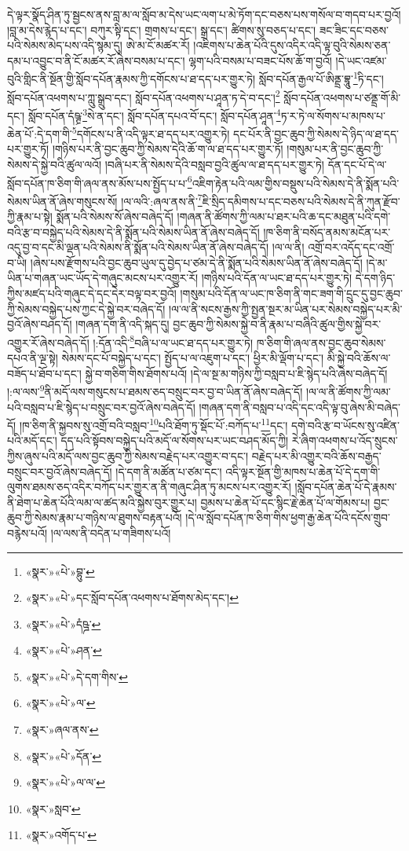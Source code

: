 དེ་ལྟར་སྣོད་ཤིན་ཏུ་སྦྱངས་ནས་བླ་མ་ལ་སློབ་མ་དེས་ཡང་ལག་པ་མེ་ཏོག་དང་བཅས་པས་གསོལ་བ་གདབ་པར་བྱའོ། །བླ་མ་དེས་རྙེད་པ་དང་། བཀུར་སྟི་དང་། གྲགས་པ་དང་། སྒྲ་དང་། ཚིགས་སུ་བཅད་པ་དང་། ཟང་ཟིང་དང་བཅས་པའི་སེམས་མེད་པས་འདི་སྙམ་དུ། ཨེ་མ་ངོ་མཚར་རོ། །འཇིགས་པ་ཆེན་པོའི་དུས་འདིར་འདི་ལྟ་བུའི་སེམས་ཅན་དམ་པ་འབྱུང་བ་ནི་ངོ་མཚར་རོ་ཞེས་བསམ་པ་དང་། ལྷག་པའི་བསམ་པ་བཟང་པོས་ཆོ་ག་བྱའོ། །དེ་ཡང་འཛམ་བུའི་གླིང་ནི་སྔོན་གྱི་སློབ་དཔོན་རྣམས་ཀྱི་དགོངས་པ་ཐ་དད་པར་གྱུར་ཏེ། སློབ་དཔོན་རྒྱལ་པོ་ཨིནྡྲ་བྷཱུ་\footnote{«སྣར་»«པེ་»བྷུ་}ཏི་དང་། སློབ་དཔོན་འཕགས་པ་ཀླུ་སྒྲུབ་དང་། སློབ་དཔོན་འཕགས་པ་ཤཱན་ཏ་དེ་བ་དང་།\footnote{«སྣར་»«པེ་»དང་སློབ་དཔོན་འཕགས་པ་ཐོགས་མེད་དང་།} སློབ་དཔོན་འཕགས་པ་ཙནྡྲ་གོ་མི་དང་། སློབ་དཔོན་དཾཥྚྲ་\footnote{«སྣར་»«པེ་»དཾཥྜ་}སེ་ན་དང་། སློབ་དཔོན་དཔའ་བོ་དང་། སློབ་དཔོན་ཤཱན་\footnote{«སྣར་»«པེ་»ཤན་}ཏ་ར་ཏེ་ལ་སོགས་པ་མཁས་པ་ཆེན་པོ་:དེ་དག་གི་\footnote{«སྣར་»«པེ་»དེ་དག་གིས་}དགོངས་པ་ནི་འདི་ལྟར་ཐ་དད་པར་འགྱུར་ཏེ། དང་པོར་ནི་བྱང་ཆུབ་ཀྱི་སེམས་དེ་ཉིད་ལ་ཐ་དད་པར་གྱུར་ཏོ། །གཉིས་པར་ནི་བྱང་ཆུབ་ཀྱི་སེམས་དེའི་ཆོ་ག་ལ་ཐ་དད་པར་གྱུར་ཏོ། །གསུམ་པར་ནི་བྱང་ཆུབ་ཀྱི་སེམས་དེ་སྐྱེ་བའི་ཚུལ་ལའོ། །བཞི་པར་ནི་སེམས་དེའི་བསླབ་བྱའི་ཚུལ་ལ་ཐ་དད་པར་གྱུར་ཏེ། དོན་དང་པོ་དེ་ལ་སློབ་དཔོན་ཁ་ཅིག་གི་ཞལ་ནས་མོས་པས་སྤྱོད་པ་པ་\footnote{«སྣར་»«པེ་»ལ་}འཇིག་རྟེན་པའི་ལམ་གྱིས་བསྡུས་པའི་སེམས་དེ་ནི་སྨོན་པའི་སེམས་ཡིན་ནོ་ཞེས་གསུངས་སོ། །ལ་ལའི་:ཞལ་ནས་ནི་\footnote{«སྣར་»ཞལ་ནས་}ཇི་སྲིད་དམིགས་པ་དང་བཅས་པའི་སེམས་དེ་ནི་ཀུན་རྫོབ་ཀྱི་རྣམ་པ་སྟེ། སྨོན་པའི་སེམས་སོ་ཞེས་བཞེད་དོ། །གཞན་ནི་ཚོགས་ཀྱི་ལམ་པ་ཐར་པའི་ཆ་དང་མཐུན་པའི་དགེ་བའི་རྩ་བ་བསྐྱེད་པའི་སེམས་དེ་ནི་སྨོན་པའི་སེམས་ཡིན་ནོ་ཞེས་བཞེད་དོ། །ཁ་ཅིག་ནི་བསོད་ནམས་མངོན་པར་འདུ་བྱ་བ་དང་མི་ལྡན་པའི་སེམས་ནི་སྨོན་པའི་སེམས་ཡིན་ནོ་ཞེས་བཞེད་དོ། །ལ་ལ་ནི། འགྲོ་བར་འདོད་དང་འགྲོ་བ་ཡི། །ཞེས་པས་རྫོགས་པའི་བྱང་ཆུབ་ཡུལ་དུ་བྱེད་པ་ཙམ་དེ་ནི་སྨོན་པའི་སེམས་ཡིན་ནོ་ཞེས་བཞེད་དོ། །དེ་མ་ཡིན་པ་གཞན་ཡང་ཡོད་དེ་གཞུང་མངས་པར་འགྱུར་རོ། །གཉིས་པའི་དོན་ལ་ཡང་ཐ་དད་པར་གྱུར་ཏེ། དེ་དག་ཉིད་ཀྱིས་མཛད་པའི་གཞུང་དེ་དང་དེར་བལྟ་བར་བྱའོ། །གསུམ་པའི་དོན་ལ་ཡང་ཁ་ཅིག་ནི་གང་ཟག་གི་དྲུང་དུ་བྱང་ཆུབ་ཀྱི་སེམས་བསྐྱེད་པས་ཀྱང་དེ་སྐྱེ་བར་བཞེད་དོ། །ལ་ལ་ནི་སངས་རྒྱས་ཀྱི་སྤྱན་སྔར་མ་ཡིན་པར་སེམས་བསྐྱེད་པར་མི་བྱའོ་ཞེས་བཤད་དོ། །གཞན་དག་ནི་འདི་སྐད་དུ། བྱང་ཆུབ་ཀྱི་སེམས་སྐྱེ་བ་ནི་རྣམ་པ་བཞིའི་ཚུལ་གྱིས་སྐྱེ་བར་འགྱུར་རོ་ཞེས་བཞེད་དོ། །:དོན་འདི་\footnote{«སྣར་»«པེ་»དོན་}བཞི་པ་ལ་ཡང་ཐ་དད་པར་གྱུར་ཏེ། ཁ་ཅིག་གི་ཞལ་ནས་བྱང་ཆུབ་སེམས་དཔའ་ནི་ལྔ་སྟེ། སེམས་དང་པོ་བསྐྱེད་པ་དང་། སྤྱོད་པ་ལ་འཇུག་པ་དང་། ཕྱིར་མི་ལྡོག་པ་དང་། མི་སྐྱེ་བའི་ཆོས་ལ་བཟོད་པ་ཐོབ་པ་དང་། སྐྱེ་བ་གཅིག་གིས་ཐོགས་པའོ། །དེ་ལ་སྔ་མ་གཉིས་ཀྱི་བསླབ་པ་ཇི་སྙེད་པའི་ཞེས་བཞེད་དོ། །:ལ་ལས་\footnote{«སྣར་»«པེ་»ལ་ལ་}ནི་མདོ་ལས་གསུངས་པ་ཐམས་ཅད་བསྲུང་བར་བྱ་བ་ཡིན་ནོ་ཞེས་བཞེད་དོ། །ལ་ལ་ནི་ཚོགས་ཀྱི་ལམ་པའི་བསླབ་པ་ཇི་སྙེད་པ་བསྲུང་བར་བྱའོ་ཞེས་བཞེད་དོ། །གཞན་དག་ནི་བསླབ་པ་འདི་དང་འདི་ལྟ་བུ་ཞེས་མི་བཞེད་དོ། །ཁ་ཅིག་ནི་སྐྱབས་སུ་འགྲོ་བའི་བསླབ་\footnote{«སྣར་»སླབ་}པའི་ཐོག་ཏུ་སྡོང་པོ་:བཀོད་པ་\footnote{«སྣར་»འགོད་པ་}དང་། དགེ་བའི་རྩ་བ་ཡོངས་སུ་འཛིན་པའི་མདོ་དང་། དད་པའི་སྟོབས་བསྐྱེད་པའི་མདོ་ལ་སོགས་པར་ཡང་བཤད་མོད་ཀྱི། རེ་ཞིག་འཕགས་པ་འོད་སྲུངས་ཀྱིས་ཞུས་པའི་མདོ་ལས་བྱང་ཆུབ་ཀྱི་སེམས་བརྗེད་པར་འགྱུར་བ་དང་། བརྗེད་པར་མི་འགྱུར་བའི་ཆོས་བརྒྱད་བསྲུང་བར་བྱའོ་ཞེས་བཞེད་དོ། །དེ་དག་ནི་མཚོན་པ་ཙམ་དང་། འདི་ལྟར་སྔོན་གྱི་མཁས་པ་ཆེན་པོ་དེ་དག་གི་ལུགས་ཐམས་ཅད་འདིར་བཀོད་པར་གྱུར་ན་ནི་གཞུང་ཤིན་ཏུ་མངས་པར་འགྱུར་རོ། །སློབ་དཔོན་ཆེན་པོ་དེ་རྣམས་ནི་ཐེག་པ་ཆེན་པོའི་ལམ་ལ་ཚད་མའི་སྐྱེས་བུར་གྱུར་པ། བྱམས་པ་ཆེན་པོ་དང་སྙིང་རྗེ་ཆེན་པོ་ལ་གོམས་པ། བྱང་ཆུབ་ཀྱི་སེམས་རྣམ་པ་གཉིས་ལ་ཐུགས་བརྟན་པའོ། །དེ་ལ་སློབ་དཔོན་ཁ་ཅིག་གིས་ཕྱག་རྒྱ་ཆེན་པོའི་དངོས་གྲུབ་བརྙེས་པའོ། །ལ་ལས་ནི་བདེན་པ་གཟིགས་པའོ། 